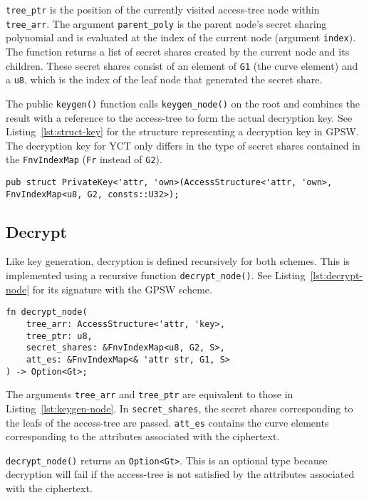 \verb+tree_ptr+ is the position of the currently visited \gls{access-tree} node within \verb+tree_arr+.
The argument \verb+parent_poly+ is the parent node's secret sharing polynomial and is evaluated at the index of the current node (argument \texttt{index}).
The function returns a list of secret shares created by the current node and its children. 
These secret shares consist of an element of \texttt{G1} (the curve element) and a \texttt{u8}, which is the index of the leaf node that generated the secret share.

The public \verb+keygen()+ function calls \verb+keygen_node()+ on the root and combines the result with a reference to the \gls{access-tree} to form the actual decryption key.
See Listing~\ref{lst:struct-key} for the structure representing a decryption key in GPSW.
The decryption key for YCT only differs in the type of secret shares contained in the \texttt{FnvIndexMap} (\texttt{Fr} instead of \texttt{G2}).

\begin{lstlisting}[float=h,caption={Decryption key struct},label={lst:struct-key}, breaklines=true]
pub struct PrivateKey<'attr, 'own>(AccessStructure<'attr, 'own>, FnvIndexMap<u8, G2, consts::U32>);
\end{lstlisting}

\subsection{Decrypt}
Like key generation, decryption is defined recursively for both schemes.
This is implemented using a recursive function \verb+decrypt_node()+.
See Listing~\ref{lst:decrypt-node} for its signature with the GPSW scheme.

\begin{lstlisting}[float=h,caption={Function signature of recursive decryption},label={lst:decrypt-node}]
fn decrypt_node(
    tree_arr: AccessStructure<'attr, 'key>,
    tree_ptr: u8,
    secret_shares: &FnvIndexMap<u8, G2, S>,
    att_es: &FnvIndexMap<& 'attr str, G1, S>
) -> Option<Gt>;
\end{lstlisting}

The arguments \verb+tree_arr+ and \verb+tree_ptr+ are equivalent to those in Listing~\ref{lst:keygen-node}.
In \verb+secret_shares+, the secret shares corresponding to the leafs of the \gls{access-tree} are passed.
\verb+att_es+ contains the curve elements corresponding to the attributes associated with the ciphertext.

\verb+decrypt_node()+ returns an \verb+Option<Gt>+.
This is an optional type because decryption will fail if the \gls{access-tree} is not satisfied by the attributes associated with the ciphertext.

